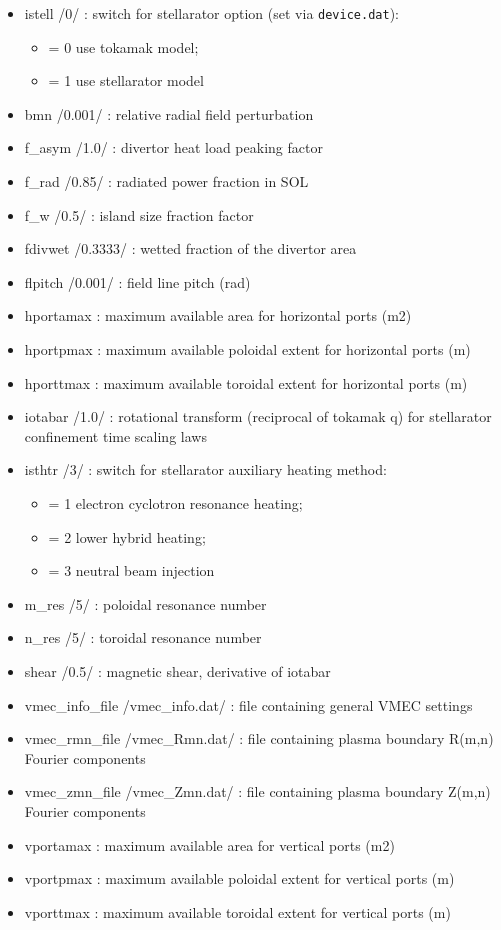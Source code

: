 \documentclass[]{article}
\begin{document}
\begin{itemize}
\itemsep1pt\parskip0pt
\item
  istell /0/ : switch for stellarator option (set via
  \texttt{device.dat}):

  \begin{itemize}
  \itemsep1pt\parskip0pt
  \item
    = 0 use tokamak model;
  \item
    = 1 use stellarator model
  \end{itemize}
\item
  bmn /0.001/ : relative radial field perturbation
\item
  f\_asym /1.0/ : divertor heat load peaking factor
\item
  f\_rad /0.85/ : radiated power fraction in SOL
\item
  f\_w /0.5/ : island size fraction factor
\item
  fdivwet /0.3333/ : wetted fraction of the divertor area
\item
  flpitch /0.001/ : field line pitch (rad)
\item
  hportamax : maximum available area for horizontal ports (m2)
\item
  hportpmax : maximum available poloidal extent for horizontal ports (m)
\item
  hporttmax : maximum available toroidal extent for horizontal ports (m)
\item
  iotabar /1.0/ : rotational transform (reciprocal of tokamak q) for
  stellarator confinement time scaling laws
\item
  isthtr /3/ : switch for stellarator auxiliary heating method:

  \begin{itemize}
  \itemsep1pt\parskip0pt
  \item
    = 1 electron cyclotron resonance heating;
  \item
    = 2 lower hybrid heating;
  \item
    = 3 neutral beam injection
  \end{itemize}
\item
  m\_res /5/ : poloidal resonance number
\item
  n\_res /5/ : toroidal resonance number
\item
  shear /0.5/ : magnetic shear, derivative of iotabar
\item
  vmec\_info\_file /vmec\_info.dat/ : file containing general VMEC
  settings
\item
  vmec\_rmn\_file /vmec\_Rmn.dat/ : file containing plasma boundary
  R(m,n) Fourier components
\item
  vmec\_zmn\_file /vmec\_Zmn.dat/ : file containing plasma boundary
  Z(m,n) Fourier components
\item
  vportamax : maximum available area for vertical ports (m2)
\item
  vportpmax : maximum available poloidal extent for vertical ports (m)
\item
  vporttmax : maximum available toroidal extent for vertical ports (m)
\end{itemize}
\end{document}

